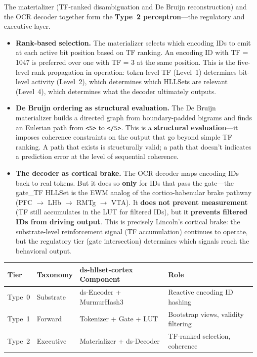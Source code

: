 \documentclass[11pt,a4paper]{article}
\theoremstyle{remark}
\begin{document}
The materializer (TF-ranked disambiguation and De Bruijn reconstruction) and
the OCR decoder together form the \textbf{Type~2 perceptron}---the regulatory
and executive layer.

\begin{itemize}[leftmargin=*,nosep]
  \item \textbf{Rank-based selection.} The materializer selects which
    encoding IDs to emit at each active bit position based on TF ranking. An
    encoding ID with TF = 1047 is preferred over one with TF = 3 at the same
    position. This is the five-level rank propagation in operation:
    token-level TF (Level~1) determines bit-level activity (Level~2), which
    determines which HLLSets are relevant (Level~4), which determines what the
    decoder ultimately outputs.
  \item \textbf{De Bruijn ordering as structural evaluation.} The De Bruijn
    materializer builds a directed graph from boundary-padded bigrams and finds
    an Eulerian path from \texttt{<S>} to \texttt{</S>}. This is a
    \textbf{structural evaluation}---it imposes coherence constraints on the
    output that go beyond simple TF ranking. A path that exists is structurally
    valid; a path that doesn't indicates a prediction error at the level of
    sequential coherence.
  \item \textbf{The decoder as cortical brake.} The OCR decoder maps encoding
    IDs back to real tokens. But it does so \textbf{only} for IDs that pass
    the gate---the gate\_TF HLLSet is the EWM analog of the cortico-habenular
    brake pathway (PFC $\to$ LHb $\to$ RMTg $\to$ VTA). It \textbf{does not
    prevent measurement} (TF still accumulates in the LUT for filtered IDs),
    but it \textbf{prevents filtered IDs from driving output}. This is
    precisely Lincoln's cortical brake: the substrate-level reinforcement
    signal (TF accumulation) continues to operate, but the regulatory tier
    (gate intersection) determines which signals reach the behavioral output.
\end{itemize}

\begin{center}
\begin{tabular}{@{}llll@{}}
\toprule
\textbf{Tier} & \textbf{Taxonomy} & \textbf{ds-hllset-cortex Component} & \textbf{Role} \\
\midrule
Type~0 & Substrate   & ds-Encoder + MurmurHash3 & Reactive encoding ID hashing \\
Type~1 & Forward     & Tokenizer + Gate + LUT   & Bootstrap views, validity filtering \\
Type~2 & Executive   & Materializer + ds-Decoder& TF-ranked selection, coherence \\
\bottomrule
\end{tabular}
\end{center}
\end{document}
